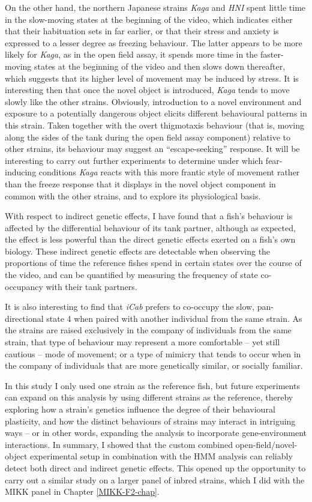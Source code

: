 \documentclass[
]{book}
\begin{document}
On the other hand, the northern Japanese strains \emph{Kaga} and \emph{HNI} spent little time in the slow-moving states at the beginning of the video, which indicates either that their habituation sets in far earlier, or that their stress and anxiety is expressed to a lesser degree as freezing behaviour. The latter appears to be more likely for \emph{Kaga}, as in the open field assay, it spends more time in the faster-moving states at the beginning of the video and then slows down thereafter, which suggests that its higher level of movement may be induced by stress. It is interesting then that once the novel object is introduced, \emph{Kaga} tends to move slowly like the other strains. Obviously, introduction to a novel environment and exposure to a potentially dangerous object elicits different behavioural patterns in this strain. Taken together with the overt thigmotaxis behaviour (that is, moving along the sides of the tank during the open field assay component) relative to other strains, its behaviour may suggest an ``escape-seeking'' response. It will be interesting to carry out further experiments to determine under which fear-inducing conditions \emph{Kaga} reacts with this more frantic style of movement rather than the freeze response that it displays in the novel object component in common with the other strains, and to explore its physiological basis.

With respect to indirect genetic effects, I have found that a fish's behaviour is affected by the differential behaviour of its tank partner, although as expected, the effect is less powerful than the direct genetic effects exerted on a fish's own biology. These indirect genetic effects are detectable when observing the proportions of time the reference fishes spend in certain states over the course of the video, and can be quantified by measuring the frequency of state co-occupancy with their tank partners.

It is also interesting to find that \emph{iCab} prefers to co-occupy the slow, pan-directional state 4 when paired with another individual from the same strain. As the strains are raised exclusively in the company of individuals from the same strain, that type of behaviour may represent a more comfortable -- yet still cautious -- mode of movement; or a type of mimicry that tends to occur when in the company of individuals that are more genetically similar, or socially familiar.

In this study I only used one strain as the reference fish, but future experiments can expand on this analysis by using different strains as the reference, thereby exploring how a strain's genetics influence the degree of their behavioural plasticity, and how the distinct behaviours of strains may interact in intriguing ways -- or in other words, expanding the analysis to incorporate gene-environment interactions. In summary, I showed that the custom combined open-field/novel-object experimental setup in combination with the HMM analysis can reliably detect both direct and indirect genetic effects. This opened up the opportunity to carry out a similar study on a larger panel of inbred strains, which I did with the MIKK panel in Chapter \ref{MIKK-F2-chap}.
\end{document}
